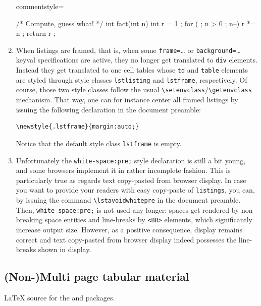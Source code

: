 \begin{enumerate}
{commentstyle={\em\color{magenta}}}%
{\lstset{language=C, style=colors}}
{}
\begin{clisting}
/* Compute, guess what! */
int fact(int n) {
  int r = 1 ;
  for ( ; n > 0 ; n--) {
    r *= n ;
  }
  return r ;
}
\end{clisting}
\endgroup\fi
\item When listings are framed, that is, when  some
\texttt{frame=}\ldots{} or \texttt{background=}\ldots{} keyval
specifications are active, they no longer get translated to \verb+div+
elements.
Instead they get translated to one cell tables whose \verb+td+
and \verb+table+ elements
are styled through style classes \texttt{lstlisting} and
\texttt{lstframe}, respectively. Of course, those two style classes
follow the usual \verb+\setenvclass+/\verb+\getenvclass+ mechanism.
That way, one can for instance center all framed listings by issuing
the following declaration in the document preamble:
\begin{verbatim}
\newstyle{.lstframe}{margin:auto;}
\end{verbatim}
Notice that the default style class \texttt{lstframe} is empty.

\item {}%
Unfortunately the \verb+white-space:pre;+ style declaration is still a
bit young, and some browsers implement it in rather incomplete
fashion.  This is particularly true as regards text copy-pasted from
browser display.  In case you want to provide your readers with easy
copy-paste of \texttt{listings}, you can, by issuing the command
\verb+\lstavoidwhitepre+ in the document preamble.  Then,
\verb+white-space:pre;+ is not used any longer: spaces get rendered
by non-breaking space entities and line-breaks by \verb+<BR>+ elements,
which significantly increase output size.  However, as a positive
consequence, display remains correct and text copy-pasted from browser
display indeed possesses the line-breaks shown in display.
\end{enumerate}


\subsection{(Non-)Multi page tabular material}
%
\ifhevea\LaTeX{} source
for the
and 
packages.\fi

